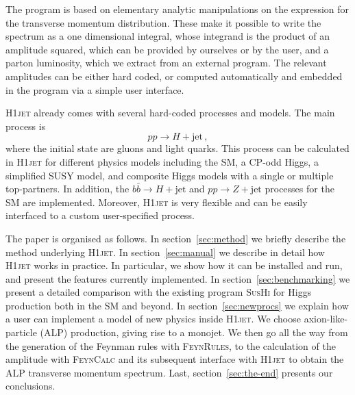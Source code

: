 \documentclass[12pt]{article}
\begin{document}
The program is based on elementary analytic manipulations on the expression
for the transverse momentum distribution. These make it possible to
write the spectrum as a one dimensional integral, whose integrand is
the product of an amplitude squared, which can be provided by ourselves or by the user, and a parton luminosity, which we extract from an external
program. The relevant amplitudes can be
either hard coded, or computed automatically and embedded in the program
via a simple user interface.

\textsc{H1jet} already comes with several hard-coded processes and models. 
The main process is 
\begin{equation}
    pp \to H + \mathrm{jet} \,, 
\end{equation}
where the initial state are gluons and light quarks. This process can
be calculated in \textsc{H1jet} for different physics models including
the SM, a CP-odd Higgs, a simplified SUSY model, and composite Higgs
models with a single or multiple top-partners. In addition, the
$b\bar{b} \to H + \mathrm{jet}$ and $pp \to Z + \mathrm{jet}$
processes for the SM are implemented. Moreover, \textsc{H1jet} is very
flexible and can be easily interfaced to a custom user-specified
process.

The paper is organised as follows. In section~\ref{sec:method} we
briefly describe the method underlying \textsc{H1jet}. In
section~\ref{sec:manual} we describe in detail how \textsc{H1jet}
works in practice. In particular, we show how it can be installed and
run, and present the features currently implemented. In
section~\ref{sec:benchmarking} we present a detailed comparison with
the existing program \textsc{SusHi} for Higgs production both in the
SM and beyond. In section~\ref{sec:newprocs} we explain how a user can
implement a model of new physics inside \textsc{H1jet}. We choose axion-like-particle 
(ALP) production, giving rise to a monojet. We then go all the way from the
generation of the Feynman rules with \textsc{FeynRules}, to the
calculation of the amplitude with \textsc{FeynCalc} and its subsequent
interface with \textsc{H1jet} to obtain the ALP transverse momentum
spectrum. Last, section~\ref{sec:the-end} presents our conclusions.
\end{document}
